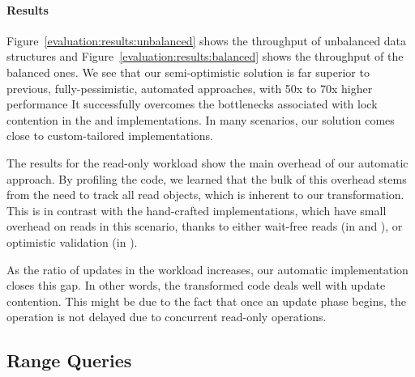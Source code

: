 \paragraph{Results}
Figure~\ref{evaluation:results:unbalanced}
shows the throughput of unbalanced data structures and Figure~\ref{evaluation:results:balanced} shows
the throughput of the balanced ones. We see that our semi-optimistic
solution is far superior to previous, fully-pessimistic,
automated approaches, with 50x to 70x
higher performance
It successfully overcomes the bottlenecks associated with lock contention
in the \domTree and \domTreap implementations. In
many scenarios, our solution comes close to custom-tailored implementations.

\begin{figure*}
\begin{center}

\end{center}
\caption{Throughput of unbalanced data structures.}
\label{evaluation:results:unbalanced}
\end{figure*}


\begin{figure*}
\begin{center}

\end{center}
\caption{Throughput of balanced data
structures.}
\label{evaluation:results:balanced}
\end{figure*}

The results for the read-only workload show the main overhead
of our automatic approach. By profiling the code, we learned
that the bulk of this overhead stems from the need to track all read objects,
which is inherent to our transformation.
This is in contrast with the hand-crafted implementations,
which have small overhead on reads in this scenario, thanks to either
wait-free reads (in \danaTree and \danaAVL), or optimistic validation (in \bronson).

As the ratio of updates in the workload increases, our automatic implementation
closes this gap.
In other words, the transformed code deals well with update contention.
This might be due to the fact that once
an update phase begins, the operation is not delayed due to concurrent
read-only operations.


\subsection{Range Queries}
\label{sec:range}

